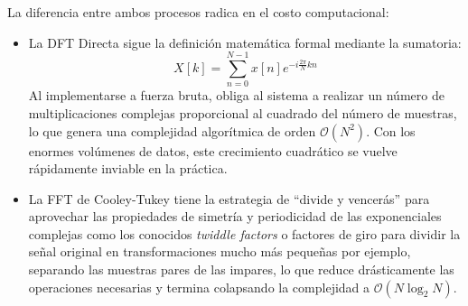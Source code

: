 La diferencia entre ambos procesos radica en el costo computacional:
\begin{itemize}
    \item La DFT Directa sigue la definición matemática formal mediante la sumatoria:
    \begin{equation*}
    X[k] = \sum_{n=0}^{N-1} x[n] e^{-i \frac{2\pi}{N} k n}
    \end{equation*}
    Al implementarse a fuerza bruta, obliga al sistema a realizar un número de multiplicaciones complejas proporcional al cuadrado del número de muestras, lo que genera una complejidad algorítmica de orden $\mathcal{O}(N^2)$. Con los enormes volúmenes de datos, este crecimiento cuadrático se vuelve rápidamente inviable en la práctica.
    
    \item La FFT de Cooley-Tukey tiene la estrategia de ``divide y vencerás'' para aprovechar las propiedades de simetría y periodicidad de las exponenciales complejas como los conocidos \textit{twiddle factors} o factores de giro para dividir la señal original en transformaciones mucho más pequeñas por ejemplo, separando las muestras pares de las impares, lo que reduce drásticamente las operaciones necesarias y termina colapsando la complejidad a $\mathcal{O}(N \log_2 N)$.
\end{itemize}
